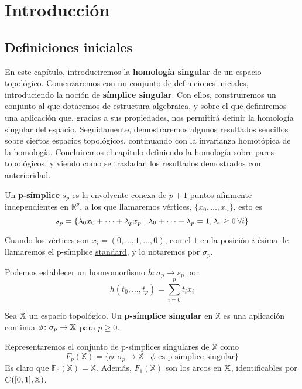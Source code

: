 \chapter{Introducción}\label{ch:introduccion}

\section{Definiciones iniciales}

En este capítulo, introduciremos la \textbf{homología singular} de un espacio topológico. Comenzaremos con
un conjunto de definiciones iniciales, introduciendo la noción de \textbf{símplice singular}. Con ellos,
construiremos un conjunto al que dotaremos de estructura algebraica, y sobre el que definiremos una aplicación
que, gracias a sus propiedades, nos permitirá definir la homología singular del espacio. Seguidamente,
demostraremos algunos resultados sencillos sobre ciertos espacios topológicos, continuando con la invarianza
homotópica de la homología. Concluiremos el capítulo definiendo la homología sobre pares topológicos, y
viendo como se trasladan los resultados demostrados con anterioridad. \citep{vick:1973}

\begin{definition}
Un \textbf{p-símplice} $s_p$ es la envolvente conexa de $p+1$ puntos afínmente independientes en $\mathbb{R}^p$,
a los que llamaremos vértices, $\{x_0, \dots, x_n\}$, esto es
\[ s_p = \{\lambda_0 x_0 + \dots + \lambda_p x_p \mid \lambda_0 + \dots + \lambda_p = 1, \lambda_i \geq 0 \hspace{0.2em} \forall i \} \]
\end{definition}
Cuando los vértices son $x_i = (0, \dots, 1, \dots, 0)$, con el $1$ en la posición $i$-ésima, le llamaremos el p-símplice \underline{standard},
y lo notaremos por $\sigma_p$.

Podemos establecer un homeomorfismo $h \colon \sigma_p \to s_p$ por
\[ h(t_0, \dots, t_p) = \sum\limits_{i = 0}^p t_i x_i \]

\begin{definition}
Sea ${\mathbb X}$ un espacio topológico. Un \textbf{p-símplice singular} en $\mathbb{X}$ es una aplicación continua $\phi \colon \sigma_p \to {\mathbb X}$ para $p \geq 0$.
\end{definition}

Representaremos el conjunto de p-símplices singulares de $\mathbb{X}$ como
\[F_p(\mathbb{X}) = \{\phi \colon \sigma_p \to \mathbb{X} \mid \phi \text{ es p-símplice singular}\}\]
Es claro que $\mathbb{F}_0(\mathbb{X}) = \mathbb{X}$. Además, $F_1(\mathbb{X})$ son los arcos en ${\mathbb X}$, identificables por
$\mathbb \mathcal{C}([0,1], {\mathbb X})$.

